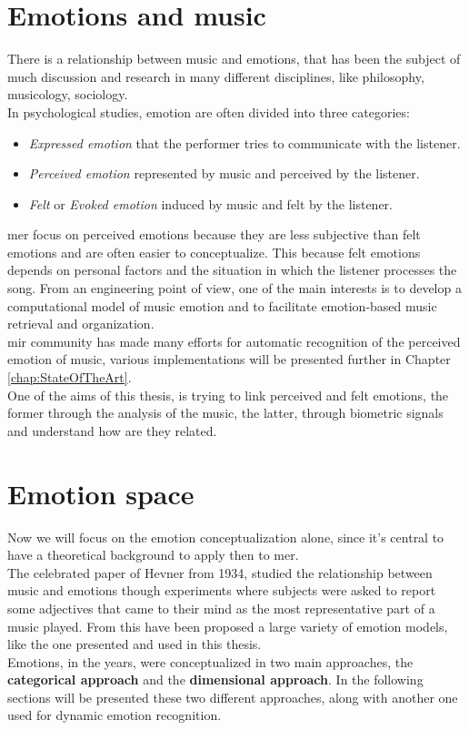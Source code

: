 \newpage
\section{Emotions and music}
There is a relationship between music and emotions, that has been the subject of much discussion and research in many different disciplines, like philosophy, musicology, sociology.
\\
In psychological studies, emotion are often divided into three categories:
\begin{itemize}
	\item \textit{Expressed emotion} that the performer tries to communicate with the listener.
	\item \textit{Perceived emotion} represented by music and perceived by the listener.
	\item \textit{Felt} or \textit{Evoked emotion} induced by music and felt by the listener.
\end{itemize}
\gls{mer} focus on perceived emotions because they are less subjective than felt emotions and are often easier to conceptualize. This because felt emotions depends on personal factors and the situation in which the listener processes the song.
From an engineering point of view, one of the main interests is to develop a computational model of music emotion and to facilitate emotion-based music retrieval and organization.
\\
\gls{mir} community has made many efforts for automatic recognition of the perceived emotion of music, various implementations will be presented further in Chapter \ref{chap:StateOfTheArt}.
\\ \indent
One of the aims of this thesis, is trying to link perceived and felt emotions, the former through the analysis of the music, the latter, through biometric signals and understand how are they related.

\section{Emotion space}
Now we will focus on the emotion conceptualization alone, since it's central to have a theoretical background to apply then to \gls{mer}.
\\ \indent
The celebrated paper of Hevner \cite{hevner1935expression} from 1934, studied the relationship between music and emotions though experiments where subjects were asked to report some adjectives that came to their mind as the most representative part of a music played. From this have been proposed a large variety of emotion models, like the one presented and used in this thesis.
\\ \indent
Emotions, in the years, were conceptualized in two main approaches, the \textbf{categorical approach} and the \textbf{dimensional approach}. In the following sections will be presented these two different approaches, along with another one used for dynamic emotion recognition.

